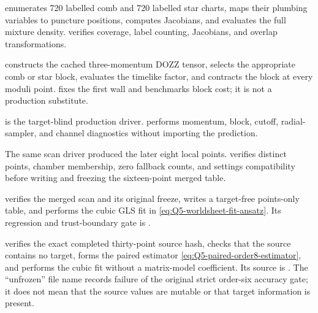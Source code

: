 \documentclass[11pt]{article}
\begin{document}
\begin{description}[style=nextline,leftmargin=3.8cm]
  \item[Six-point atlases]
   enumerates 720 labelled comb and 720
  labelled star charts, maps their plumbing variables to puncture positions,
  computes Jacobians, and evaluates the full mixture density.
   verifies coverage, label counting,
  Jacobians, and overlap transformations.

  \item[Worldsheet kernel]
   constructs the cached
  three-momentum DOZZ tensor, selects the appropriate comb or star block,
  evaluates the timelike factor, and contracts the block at every moduli
  point.   fixes the first wall
  and benchmarks block cost; it is not a production substitute.

  \item[Production/audit]
   is the target-blind production
  driver.   performs momentum,
  block, cutoff, radial-sampler, and channel diagnostics without importing
  the prediction.

  \item[Extension/merge]
  The same scan driver produced the later eight local points.
   verifies distinct points,
  chamber membership, zero fallback counts, and settings compatibility before
  writing and freezing the sixteen-point merged table.

  \item[Imaginary-ray fit]
   verifies the merged scan and
  its original freeze, writes a target-free points-only table, and performs
  the cubic GLS fit in \eqref{eq:Q5-worldsheet-fit-ansatz}.  Its regression and
  trust-boundary gate is
  .

  \item[Current order-eight fit]
   verifies the exact completed
  thirty-point source hash, checks that the source contains no target, forms
  the paired estimator \eqref{eq:Q5-paired-order8-estimator}, and performs the
  cubic fit without a matrix-model coefficient.  Its source is
  .  The ``unfrozen'' file name records
  failure of the original strict order-six accuracy gate; it does not mean
  that the source values are mutable or that target information is present.


\end{description}
\end{document}
